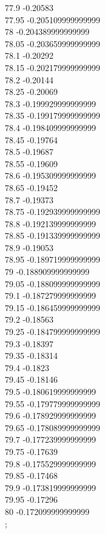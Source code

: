 {77.9	-0.20583\\
77.95	-0.205109999999999\\
78	-0.204389999999999\\
78.05	-0.203659999999999\\
78.1	-0.20292\\
78.15	-0.202179999999999\\
78.2	-0.20144\\
78.25	-0.20069\\
78.3	-0.199929999999999\\
78.35	-0.199179999999999\\
78.4	-0.198409999999999\\
78.45	-0.19764\\
78.5	-0.19687\\
78.55	-0.19609\\
78.6	-0.195309999999999\\
78.65	-0.19452\\
78.7	-0.19373\\
78.75	-0.192939999999999\\
78.8	-0.192139999999999\\
78.85	-0.191339999999999\\
78.9	-0.19053\\
78.95	-0.189719999999999\\
79	-0.188909999999999\\
79.05	-0.188099999999999\\
79.1	-0.187279999999999\\
79.15	-0.186459999999999\\
79.2	-0.18563\\
79.25	-0.184799999999999\\
79.3	-0.18397\\
79.35	-0.18314\\
79.4	-0.1823\\
79.45	-0.18146\\
79.5	-0.180619999999999\\
79.55	-0.179779999999999\\
79.6	-0.178929999999999\\
79.65	-0.178089999999999\\
79.7	-0.177239999999999\\
79.75	-0.17639\\
79.8	-0.175529999999999\\
79.85	-0.17468\\
79.9	-0.173819999999999\\
79.95	-0.17296\\
80	-0.172099999999999\\
};
